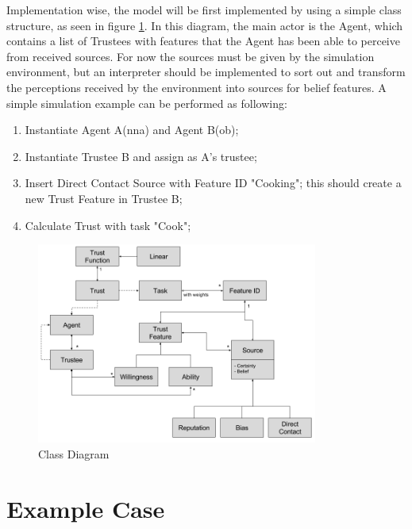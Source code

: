 Implementation wise, the model will be first implemented by using a simple class structure, as seen in figure \ref{fig:classDiagram}. In this diagram, the main actor is the Agent, which contains a list of Trustees with features that the Agent has been able to perceive from received sources. For now the sources must be given by the simulation environment, but an interpreter should be implemented to sort out and transform the perceptions received by the environment into sources for belief features.
A simple simulation example can be performed as following:
\begin{enumerate}
	\item Instantiate Agent A(nna) and Agent B(ob);
	\item Instantiate Trustee B and assign as A's trustee;
	\item Insert Direct Contact Source with Feature ID "Cooking"; this should create a new Trust Feature in Trustee B;
	\item Calculate Trust with task "Cook";
\end{enumerate}

\begin{figure}[hbt]
	\centering
	\includegraphics[height=250px]{figures/Class_Diagram.png}
	\caption{Class Diagram}
	\label{fig:classDiagram}
\end{figure}

\section{Example Case}



